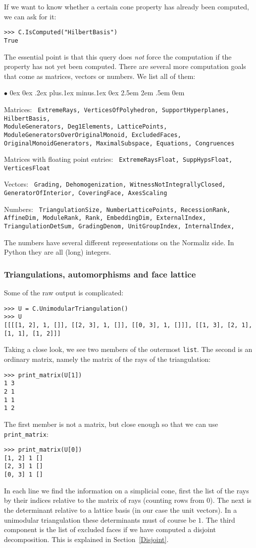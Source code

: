 \documentclass[12pt,a4paper]{scrartcl}
\newcommand{\stdli}{ \topsep0ex \partopsep0ex %
\parsep.2ex plus.1ex minus.1ex \itemsep0ex%
\leftmargin2.5em \labelwidth2em \labelsep.5em \rightmargin0em}%
\renewenvironment{itemize}{\begin{list}{{$\bullet$}}{\stdli}}{\end{list}}
\theoremstyle{definition}
\def\ttt{\texttt}
\begin{document}
\begin{small}
If we want to know whether a certain cone property has already been computed, we can ask for it:
\begin{Verbatim}
>>> C.IsComputed("HilbertBasis")
True
\end{Verbatim}
The essential point is that this query does \emph{not} force the computation if the property has not yet been computed.
There are several more computation goals that come as matrices, vectors or numbers. We list all of them:
\begin{itemize}
	\item Matrices: \ttt{    ExtremeRays,
		VerticesOfPolyhedron,
		SupportHyperplanes,
		HilbertBasis,\\
		ModuleGenerators,
		Deg1Elements,
		LatticePoints,
		ModuleGeneratorsOverOriginalMonoid,
		ExcludedFaces,
		OriginalMonoidGenerators,
		MaximalSubspace,
		Equations,
		Congruences}
	\item Matrices with floating point entries: \ttt{    ExtremeRaysFloat,
		SuppHypsFloat,
		VerticesFloat}
	\item Vectors: \ttt{    Grading,
		Dehomogenization,
		WitnessNotIntegrallyClosed,
		GeneratorOfInterior,
		CoveringFace,
		AxesScaling}
	\item Numbers: \ttt{    
		TriangulationSize,
		NumberLatticePoints,
		RecessionRank,
		AffineDim,
		ModuleRank,
		Rank,
		EmbeddingDim,
		ExternalIndex,
		TriangulationDetSum,
		GradingDenom,
		UnitGroupIndex,
		InternalIndex,}
\end{itemize}

The numbers have several different representations on the Normaliz side. In Python they are all (long) integers.
\subsubsection{Triangulations, automorphisms and face lattice}
Some of the raw output is complicated:
\begin{Verbatim}
>>> U = C.UnimodularTriangulation()
>>> U
[[[[1, 2], 1, []], [[2, 3], 1, []], [[0, 3], 1, []]], [[1, 3], [2, 1], [1, 1], [1, 2]]]
\end{Verbatim}
Taking a close look, we see two members of the outermost \verb|list|. The second is an ordinary matrix, namely the matrix of the rays of the triangulation:
\begin{Verbatim}
>>> print_matrix(U[1])
1 3
2 1
1 1
1 2
\end{Verbatim}
The first member is not a matrix, but close enough so that we can use \verb|print_matrix|:
\begin{Verbatim}
>>> print_matrix(U[0])
[1, 2] 1 []
[2, 3] 1 []
[0, 3] 1 []
\end{Verbatim}
In each line we find the information on a simplicial cone, first the list of the rays by their indices relative to the matrix of rays (counting rows from $0$). The next is the determinant relative to a lattice basis (in our case the unit vectors). In a unimodular triangulation these determinants must of course be $1$. The third component is the list of excluded faces if we have computed a disjoint decomposition. This is explained in Section~\ref{Disjoint}.


\end{small}
\end{document}

